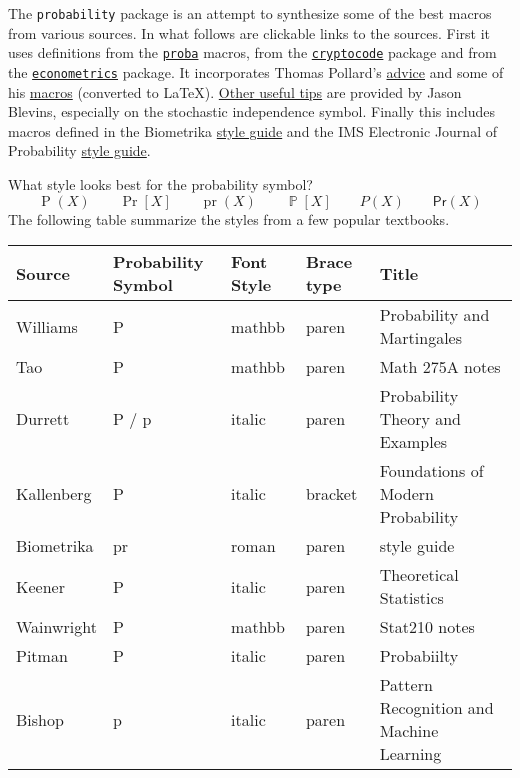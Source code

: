 \documentclass[11pt,a4paper]{ltxguide}
\begin{document}
The \texttt{probability} package is an attempt to synthesize some of the best macros from various sources.  In what follows are clickable links to the sources.  First it uses definitions from the \href{https://www.ctan.org/tex-archive/macros/latex/contrib/proba?lang=en}{\texttt{proba}} macros, from the \href{https://www.ctan.org/pkg/cryptocode}{\texttt{cryptocode}} package and from the \href{https://www.ctan.org/pkg/econometrics}{\texttt{econometrics}} package.  It incorporates Thomas Pollard's \href{http://www.stat.yale.edu/~pollard/Courses/600.spring2017/Handouts/fonts.pdf}{advice} and some of his \href{http://www.stat.yale.edu/~pollard/LaTeX/}{macros} (converted to LaTeX).  \href{https://jblevins.org/log/latex-tips}{Other useful tips} are provided by Jason Blevins, especially on the stochastic independence symbol.  Finally this includes macros defined in the Biometrika \href{https://academic.oup.com/biomet/pages/General_Instructions}{style guide} and the IMS Electronic Journal of Probability \href{http://www.e-publications.org/ims/support/ims-instructions.html}{style guide}.

What style looks best for the probability symbol?
\[
  \operatorname{P}(X) \qquad   \operatorname{Pr}[X] \qquad \operatorname{pr}(X) \qquad \operatorname{\mathbb P}[X] \qquad P(X) \qquad \mathbf{\mathsf{Pr}}(X)
\]
The following table summarize the styles from a few popular textbooks.


\begin{tabular}{l p{1.5cm} p{1.5cm} p{1.5cm} l }
Source & Probability Symbol & Font Style &  Brace type & Title\\
\hline
Williams & P & mathbb & paren & Probability and Martingales\\
Tao & P & mathbb & paren & Math 275A notes\\
Durrett & P / p & italic & paren & Probability Theory and Examples\\
Kallenberg & P & italic & bracket & Foundations of Modern Probability\\
Biometrika & pr & roman & paren & style guide\\
Keener & P & italic & paren & Theoretical Statistics\\
Wainwright & P &  mathbb & paren & Stat210 notes\\
Pitman & P & italic  & paren & Probabiilty\\
Bishop & p & italic & paren & Pattern Recognition and Machine Learning\\
\hline
\end{tabular}
\end{document}

